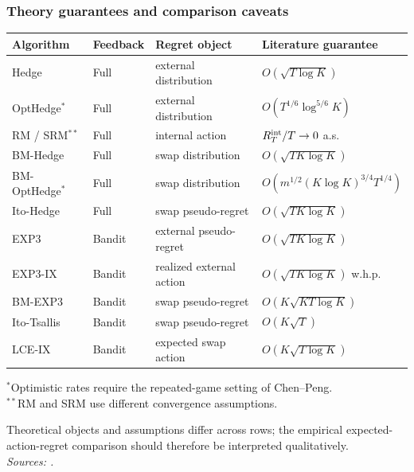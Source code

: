 \begin{frame}[noframenumbering]
  \frametitle{Theory guarantees and comparison caveats}

  \scriptsize
  \begin{tabularx}{\textwidth}{@{}l l X X@{}}
    \toprule
    Algorithm & Feedback & Regret object & Literature guarantee \\
    \midrule
    Hedge & Full & external distribution & $O(\sqrt{T\log K})$ \\
    OptHedge$^*$ & Full & external distribution & $O(T^{1/6}\log^{5/6}K)$ \\
    RM / SRM$^{**}$ & Full & internal action & $R_T^{\rm int}/T\to0$ a.s. \\
    BM-Hedge & Full & swap distribution & $O(\sqrt{TK\log K})$ \\
    BM-OptHedge$^*$ & Full & swap distribution & $O(m^{1/2}(K\log K)^{3/4}T^{1/4})$ \\
    Ito-Hedge & Full & swap pseudo-regret & $O(\sqrt{TK\log K})$ \\
    \midrule
    EXP3 & Bandit & external pseudo-regret & $O(\sqrt{TK\log K})$ \\
    EXP3-IX & Bandit & realized external action & $O(\sqrt{TK\log K})$ w.h.p. \\
    BM-EXP3 & Bandit & swap pseudo-regret & $O(K\sqrt{KT\log K})$ \\
    Ito-Tsallis & Bandit & swap pseudo-regret & $O(K\sqrt{T})$ \\
    LCE-IX & Bandit & expected swap action & $O(K\sqrt{T\log K})$ \\
    \bottomrule
  \end{tabularx}

  \vspace{0.1cm}
  {\tiny
  $^*$Optimistic rates require the repeated-game setting of Chen--Peng.\\
  $^{**}$RM and SRM use different convergence assumptions.}

  \vspace{0.1cm}
  {\scriptsize\color{black!60}
  Theoretical objects and assumptions differ across rows; the empirical expected-action-regret comparison should therefore be interpreted qualitatively.\\
  {\itshape Sources: \citep{freund_decision-theoretic_1997,chen_hedging_2020,hart_simple_2000,blum_external_2007,ito_tight_2020,auer_nonstochastic_2002,neu_explore_2015,zimmert_tsallis-inf_2021,huang_near-optimal_2023}.}
  }
\end{frame}
